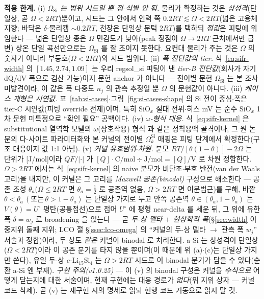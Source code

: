 \begin{warnbox}
\textbf{적용 한계.} (i) \emph{$\Omega_\mathrm{Si}$ 는 범위 시드일 뿐 점-식별 안 됨.} 물리가 확정하는 것은
\emph{상성격}(단일상, 곧 $\Omega<2RT$)뿐이고, 시드는 그 안에서 인력 쪽 $0.2RT\lesssim\Omega<2RT$(넓은 고용체 지향;
바닥은 $\delta$-물리캡 $\sim0.2RT$, 천장은 단일상 문턱 $2RT$)를 택하되 \emph{점값}은 피팅에 위임한다 --- 넓은
단일상 종은 $\Omega$ 민감도가 낮아(peak 정점이 $\Omega{\to}2RT$ 근처에서만 급변) 상온 단일 곡선만으로는
$\Omega_\mathrm{Si}$ 를 잘 조이지 못한다. 요컨대 물리가 주는 것은 $\Omega$ 의 숫자가 아니라 부등호($\Omega<2RT$)와
시드 범위다. (ii) \emph{폭 진단값의 tier.} 식~\eqref{eq:sifr-width} 의 $[1.45,2.74,1.09]$ 는 우리 regsol\_si 피팅이
낸 \emph{tier-B 진단값}(회사가 자기 dQ/dV 폭으로 검산 가능)이지 문헌 anchor 가 아니다 --- 전이별 문헌
$\Omega_\mathrm{Si}$ 는 본 조사 미발견이라, 이 값은 폭 다중도 $n_j$ 의 관측 추정일 뿐 $\Omega$ 의 문헌값이 아니다.
(iii) \emph{케이스 개형은 시연값.} 표~\ref{tab:si-cases}$\cdot$그림~\ref{fig:si-cases-shape} 의 Si 전이 중심$\cdot$폭은
tier-C 시연값(피팅 override 전제)이며, 특히 SiO$_x$ 절대 전위$\cdot$히스 mV 는 순수 SiO$_x$ 1차 문헌 미특정으로
``확인 필요'' 공백이다. (iv) \emph{$\omega$-형식 대응.} 식~\eqref{eq:sifr-kernel} 은 substitutional 열역학 모델의
$\omega$(상호작용) 형식 \cite{verbrugge2017} 과 같은 정칙용액 골격이나, 그 원 논문의 다-사이트 파라미터화와 본
커널의 전이별 $\Omega_k^\mathrm{Si}$ 매핑은 피팅 단계에서 확정한다(구조 대응이지 값 1:1 아님). (v) \emph{커널
유효범위$\cdot$차원.} 분모 $RT/[\theta(1-\theta)]-2\Omega$ 는 단위가 [J/mol]이라 $QF/|\cdot|$ 가
$[Q]{\cdot}\mathrm{C/mol}\div\mathrm{J/mol}={[Q]}/\mathrm V$ 로 차원 정합한다. $\Omega>2RT$ 에서는 식~\eqref{eq:sifr-kernel} 의 naive 분모가 비단조$\cdot$부호 반전(van der Waals 고리)을
내지만, 이 커널은 그 고리를 \emph{Maxwell 공존(binodal)} 구성으로 해소한다 ---
공존 조성 $\theta_a$($\Omega\!\le\!2RT$ 면 $\theta_a{=}\tfrac12$ 로 공존역 없음,
$\Omega\!>\!2RT$ 면 이분법근)를 구해, 바깥 $\theta\!<\!\theta_a\,(\text{또는}\,\theta\!>\!1{-}\theta_a)$ 는 단일상
가지로 두고 안쪽 공존역 $\theta\!\in\!(\theta_a,1{-}\theta_a)$ 는 $V(\theta){=}U^\circ$ 평탄(공통접선)으로 접어
$U^\circ$ 에 평형 near-delta 를 세운 뒤, 그 위에 유한 폭 $\delta{=}w_j$ 로 broadening 을 얹는다 ---
곧 \emph{두-상 델타 $+$ 현상학적 폭}(\S\ref{sec:width} 이중지위 둘째 지위; LCO 절 \S\ref{ssec:lco-omega} 의
``커널의 두-상 델타 $\to$ 관측 폭 $w_j$'' 서술과 정합)이라, 두-상도 \emph{같은} 커널이 binodal 로 처리한다.
a-Si 는 상성격이 단일상($\Omega<2RT$)이라 이 공존 분기를 타지 않을 뿐이며(이 때문에 위 (a)$\cdot$(c)는 단일상
가지만 쓴다), 유일 두-상 $c$-Li$_{15}$Si$_4$ 는 $\Omega>2RT$ 시드로 이 binodal 분기가 담을 수 있다(순환 a-Si 엔 부재).
\emph{구현 주의(v1.0.25)} --- 이 (v) 의 binodal 구성은 커널을 \emph{수식으로} 어떻게 닫는지에 대한 서술이며,
현재 구현에는 대응 경로가 \emph{없다}(위 지위 상자 --- 커널 코드 삭제). 곧 (v) 는 재구현 시의 명세로 읽되
현행 코드 거동으로 읽지 말 것.
\end{warnbox}

